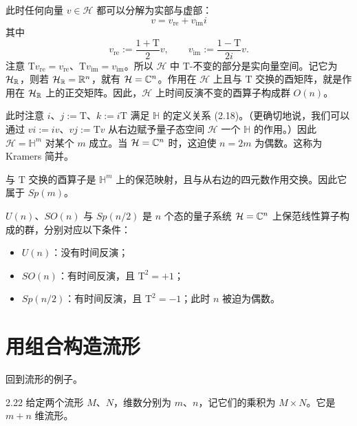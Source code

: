 此时任何向量 $v\in\mathcal{H}$ 都可以分解为实部与虚部：
\begin{equation}
v=v_{\mathrm{re}}+v_{\mathrm{im}}i \tag{2.25}
\end{equation}
其中
\begin{equation}
v_{\mathrm{re}}:=\frac{1+\mathrm{T}}{2}v,\qquad v_{\mathrm{im}}:=\frac{1-\mathrm{T}}{2i}v. \tag{2.26}
\end{equation}
注意 $\mathrm{T}v_{\mathrm{re}}=v_{\mathrm{re}}$、$\mathrm{T}v_{\mathrm{im}}=v_{\mathrm{im}}$。所以 $\mathcal{H}$ 中 $\mathrm{T}$-不变的部分是实向量空间。记它为 $\mathcal{H}_{\mathbb{R}}$，则若 $\mathcal{H}_{\mathbb{R}}=\mathbb{R}^n$，就有 $\mathcal{H}=\mathbb{C}^n$。作用在 $\mathcal{H}$ 上且与 $\mathrm{T}$ 交换的酉矩阵，就是作用在 $\mathcal{H}_{\mathbb{R}}$ 上的正交矩阵。因此，$\mathcal{H}$ 上时间反演不变的酉算子构成群 $O(n)$。

此时注意 $i$、$j:=\mathrm{T}$、$k:=i\mathrm{T}$ 满足 $\mathbb{H}$ 的定义关系 (2.18)。（更确切地说，我们可以通过 $vi:=iv$、$vj:=\mathrm{T}v$ 从右边赋予量子态空间 $\mathcal{H}$ 一个 $\mathbb{H}$ 的作用。）因此 $\mathcal{H}=\mathbb{H}^m$ 对某个 $m$ 成立。当 $\mathcal{H}=\mathbb{C}^n$ 时，这迫使 $n=2m$ 为偶数。这称为 Kramers 简并。

与 $\mathrm{T}$ 交换的酉算子是 $\mathbb{H}^m$ 上的保范映射，且与从右边的四元数作用交换。因此它属于 $Sp(m)$。

$U(n)$、$SO(n)$ 与 $Sp(n/2)$ 是 $n$ 个态的量子系统 $\mathcal{H}=\mathbb{C}^n$ 上保范线性算子构成的群，分别对应以下条件：
\begin{itemize}
\item $U(n)$：没有时间反演；
\item $SO(n)$：有时间反演，且 $\mathrm{T}^2=+1$；
\item $Sp(n/2)$：有时间反演，且 $\mathrm{T}^2=-1$；此时 $n$ 被迫为偶数。
\end{itemize}


\section{用组合构造流形}

回到流形的例子。

\begin{notation}{2.22}
给定两个流形 $M$、$N$，维数分别为 $m$、$n$，记它们的乘积为 $M\times N$。它是 $m+n$ 维流形。
\end{notation}

